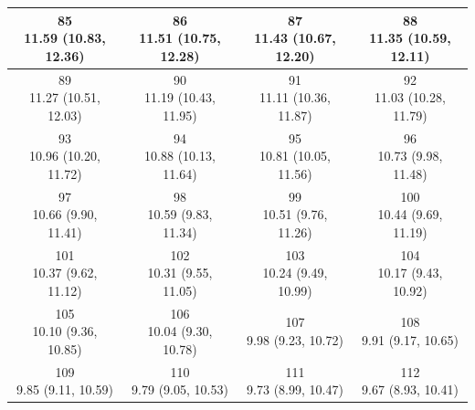 \begin{table}[htbp]
\begin{tabular}{cccc}
\hline
\shortstack[c]{85\\11.59 (10.83, 12.36)} & \shortstack[c]{86\\11.51 (10.75, 12.28)} & \shortstack[c]{87\\11.43 (10.67, 12.20)} & \shortstack[c]{88\\11.35 (10.59, 12.11)} \\
\hline
\shortstack[c]{89\\11.27 (10.51, 12.03)} & \shortstack[c]{90\\11.19 (10.43, 11.95)} & \shortstack[c]{91\\11.11 (10.36, 11.87)} & \shortstack[c]{92\\11.03 (10.28, 11.79)} \\
\hline
\shortstack[c]{93\\10.96 (10.20, 11.72)} & \shortstack[c]{94\\10.88 (10.13, 11.64)} & \shortstack[c]{95\\10.81 (10.05, 11.56)} & \shortstack[c]{96\\10.73 (9.98, 11.48)} \\
\hline
\shortstack[c]{97\\10.66 (9.90, 11.41)} & \shortstack[c]{98\\10.59 (9.83, 11.34)} & \shortstack[c]{99\\10.51 (9.76, 11.26)} & \shortstack[c]{100\\10.44 (9.69, 11.19)} \\
\hline
\shortstack[c]{101\\10.37 (9.62, 11.12)} & \shortstack[c]{102\\10.31 (9.55, 11.05)} & \shortstack[c]{103\\10.24 (9.49, 10.99)} & \shortstack[c]{104\\10.17 (9.43, 10.92)} \\
\hline
\shortstack[c]{105\\10.10 (9.36, 10.85)} & \shortstack[c]{106\\10.04 (9.30, 10.78)} & \shortstack[c]{107\\9.98 (9.23, 10.72)} & \shortstack[c]{108\\9.91 (9.17, 10.65)} \\
\hline
\shortstack[c]{109\\9.85 (9.11, 10.59)} & \shortstack[c]{110\\9.79 (9.05, 10.53)} & \shortstack[c]{111\\9.73 (8.99, 10.47)} & \shortstack[c]{112\\9.67 (8.93, 10.41)} \\

\end{tabular}
\end{table}
